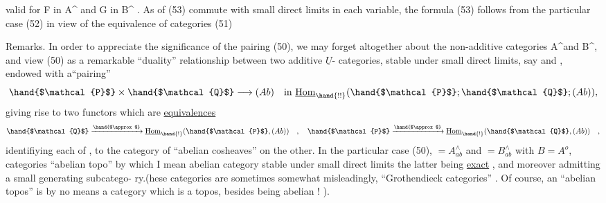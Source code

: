 
valid for  F in A\^{} and G in B\^{} .  As   of (53) commute
with small direct limits in each variable,   the formula (53) follows
from the particular case (52)\hand{,} in view of the equivalence of categories (51)

Remarks. In order to appreciate the significance of the pairing (50),
we may forget altogether about the non-additive categories A\^{}\hand{/}and B\^{},  and
view (50) as a remarkable ``duality'' relationship between two additive $\underline{U}$-%
categories,  stable under small direct limits,  say  and ,  endowed
with a``pairing''
\[ \hand{$\mathcal{P}$}\times\hand{$\mathcal{Q}$} \longrightarrow (Ab) \quad \text{in } \underline{\mathrm{Hom}}_{\hand{!!}}(\hand{$\mathcal{P}$};\hand{$\mathcal{Q}$}; (Ab)) , \]
giving rise to two functors which are \uline{equivalences}
\[ \hand{$\mathcal{Q}$}\xrightarrow{\hand{$\approx$}}\underline{\mathrm{Hom}}_{\hand{!}}(\hand{$\mathcal{P}$}, (Ab)) \quad , \quad \hand{$\mathcal{P}$}\xrightarrow{\hand{$\approx$}}\underline{\mathrm{Hom}}_{\hand{!}}(\hand{$\mathcal{Q}$}, (Ab)) \quad , \]
identifiying each of ,  to the category of ``abelian cosheaves'' on the
other.  In the particular case (50),   $= A^{\wedge}_{ab}$  and  $= B^{\wedge}_{ab}$  with $B=A^{o}$,
   categories   ``abelian topo'' by which I mean 
  abelian category stable under small  direct limits\hand{,}   the
latter being \uline{exact} ,  and moreover  admitting a small generating subcatego-%
ry.(hese categories are sometimes\hand{,}  somewhat misleadingly,  
``Grothendieck categories''\xout{\unsure{)}} .  Of course,  an ``abelian topos'' is by no
means a  category which is a topos,  besides being abelian ! ).  
